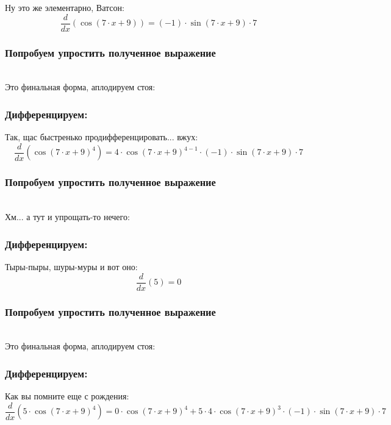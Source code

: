 \documentclass[a4paper,12pt]{article}
\begin{document}
Ну это же элементарно, Ватсон:
\begin{dmath}\frac{d}{dx}\left(\operatorname{cos}\left(7\cdot x+ 9\right) \right)=(-1)\cdot \operatorname{sin}\left(7\cdot x+ 9\right) \cdot 7\end{dmath}
\subsubsection*{Попробуем упростить полученное выражение}
\\Это финальная форма, аплодируем стоя:

\subsubsection*{Дифференцируем:}

Так, щас быстренько продифференцировать... вжух:
\begin{dmath}\frac{d}{dx}\left(\operatorname{cos}\left(7\cdot x+ 9\right) ^{4}\right)=4\cdot \operatorname{cos}\left(7\cdot x+ 9\right) ^{4- 1}\cdot (-1)\cdot \operatorname{sin}\left(7\cdot x+ 9\right) \cdot 7\end{dmath}
\subsubsection*{Попробуем упростить полученное выражение}
\\Хм... а тут и упрощать-то нечего:

\subsubsection*{Дифференцируем:}

Тыры-пыры, шуры-муры и вот оно:
\begin{dmath}\frac{d}{dx}\left(5\right)=0\end{dmath}
\subsubsection*{Попробуем упростить полученное выражение}
\\Это финальная форма, аплодируем стоя:

\subsubsection*{Дифференцируем:}

Как вы помните еще с рождения:
\begin{dmath}\frac{d}{dx}\left(5\cdot \operatorname{cos}\left(7\cdot x+ 9\right) ^{4}\right)=0\cdot \operatorname{cos}\left(7\cdot x+ 9\right) ^{4}+ 5\cdot 4\cdot \operatorname{cos}\left(7\cdot x+ 9\right) ^{3}\cdot (-1)\cdot \operatorname{sin}\left(7\cdot x+ 9\right) \cdot 7\end{dmath}
\end{document}
